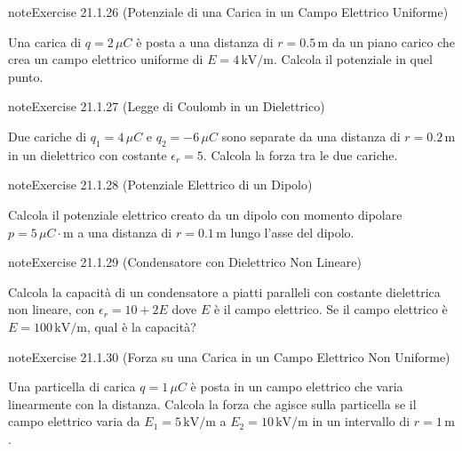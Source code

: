 \documentclass[letterpaper,10pt,italian]{jupyterBook}
\begin{document}
\begin{sphinxadmonition}{note}{Exercise 21.1.26 (Potenziale di una Carica in un Campo Elettrico Uniforme)}



\sphinxAtStartPar
Una carica di \(q = 2 \, \mu C\) è posta a una distanza di \(r = 0.5 \, \text{m}\) da un piano carico che crea un campo elettrico uniforme di \(E = 4 \, \text{kV/m}\). Calcola il potenziale in quel punto.
\end{sphinxadmonition}
 \label{exercise:ch/electromagnetism/electrostatics-problems-exercise-26}

\begin{sphinxadmonition}{note}{Exercise 21.1.27 (Legge di Coulomb in un Dielettrico)}



\sphinxAtStartPar
Due cariche di \(q_1 = 4 \, \mu C\) e \(q_2 = -6 \, \mu C\) sono separate da una distanza di \(r = 0.2 \, \text{m}\) in un dielettrico con costante \(\epsilon_r = 5\). Calcola la forza tra le due cariche.
\end{sphinxadmonition}
 \label{exercise:ch/electromagnetism/electrostatics-problems-exercise-27}

\begin{sphinxadmonition}{note}{Exercise 21.1.28 (Potenziale Elettrico di un Dipolo)}



\sphinxAtStartPar
Calcola il potenziale elettrico creato da un dipolo con momento dipolare \(p = 5 \, \mu C \cdot \text{m}\) a una distanza di \(r = 0.1 \, \text{m}\) lungo l’asse del dipolo.
\end{sphinxadmonition}
 \label{exercise:ch/electromagnetism/electrostatics-problems-exercise-28}

\begin{sphinxadmonition}{note}{Exercise 21.1.29 (Condensatore con Dielettrico Non Lineare)}



\sphinxAtStartPar
Calcola la capacità di un condensatore a piatti paralleli con costante dielettrica non lineare, con \(\epsilon_r = 10 + 2E\) dove \(E\) è il campo elettrico. Se il campo elettrico è \(E = 100 \, \text{kV/m}\), qual è la capacità?
\end{sphinxadmonition}
 \label{exercise:ch/electromagnetism/electrostatics-problems-exercise-29}

\begin{sphinxadmonition}{note}{Exercise 21.1.30 (Forza su una Carica in un Campo Elettrico Non Uniforme)}



\sphinxAtStartPar
Una particella di carica \(q = 1 \, \mu C\) è posta in un campo elettrico che varia linearmente con la distanza. Calcola la forza che agisce sulla particella se il campo elettrico varia da \(E_1 = 5 \, \text{kV/m}\) a \(E_2 = 10 \, \text{kV/m}\) in un intervallo di \(r = 1 \, \text{m}\).
\end{sphinxadmonition}
 \label{exercise:ch/electromagnetism/electrostatics-problems-exercise-30}
\end{document}
